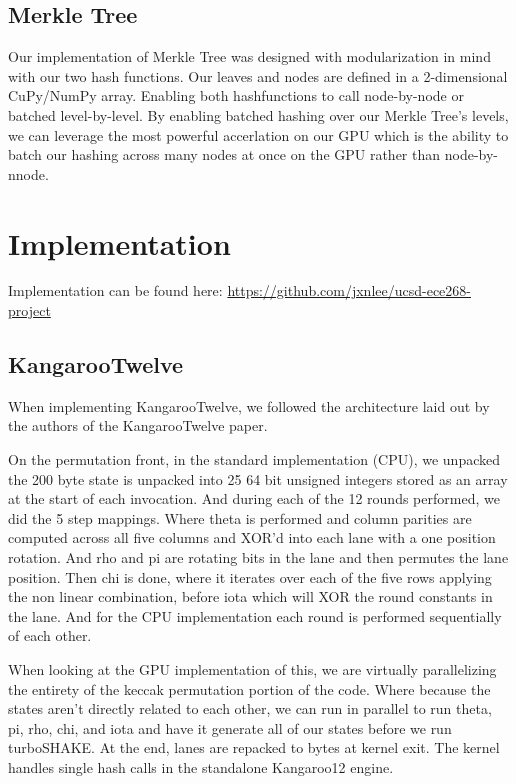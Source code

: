 \documentclass[conference]{IEEEtran}
\begin{document}
\subsection{Merkle Tree}

Our implementation of Merkle Tree was designed with modularization in mind with our two hash functions. Our leaves and nodes are defined in a 2-dimensional CuPy/NumPy array. Enabling both hashfunctions to call node-by-node or batched level-by-level. By enabling batched hashing over our Merkle Tree's levels, we can leverage the most powerful accerlation on our GPU which is the ability to batch our hashing across many nodes at once on the GPU rather than node-by-nnode.

\section{Implementation}

Implementation can be found here:
\url{https://github.com/jxnlee/ucsd-ece268-project}

\subsection{KangarooTwelve}
When implementing KangarooTwelve, we followed the architecture laid out by the authors of the KangarooTwelve paper. 

On the permutation front, in the standard implementation (CPU), we unpacked the 200 byte state is unpacked into 25 64 bit unsigned integers stored as an array at the start of each invocation. And during each of the 12 rounds performed, we did the 5 step mappings. Where theta is performed and column parities are computed across all five columns and XOR'd into each lane with a one position rotation. And rho and pi are rotating bits in the lane and then permutes the lane position. Then chi is done, where it iterates over each of the five rows applying the non linear combination, before iota which will XOR the round constants in the lane. And for the CPU implementation each round is performed sequentially of each other.

When looking at the GPU implementation of this, we are virtually parallelizing the entirety of the keccak permutation portion of the code. Where because the states aren't directly related to each other, we can run in parallel to run theta, pi, rho, chi, and iota and have it generate all of our states before we run turboSHAKE. At the end, lanes are repacked to bytes at kernel exit. The kernel handles single hash calls in the standalone Kangaroo12 engine.
\end{document}
